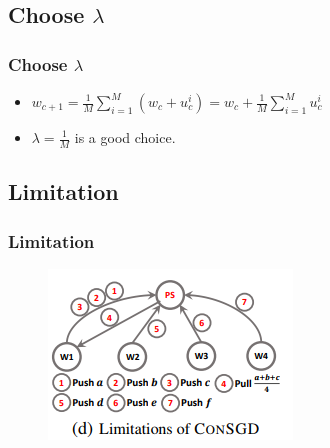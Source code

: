 \subsection{Choose $\lambda$}
\begin{frame}
    \frametitle{Choose $\lambda$}
	\begin{itemize}
		\item $w_{c+1}=\frac{1}{M}\sum_{i=1}^{M}(w_{c}+u_{c}^{i})=w_{c}+\frac{1}{M}\sum_{i=1}^{M}u_{c}^{i}$
		\item $\lambda = \frac{1}{M}$ is a good choice. 
	\end{itemize} 
\end{frame}

\subsection{Limitation}
\begin{frame}
    \frametitle{Limitation}
	\begin{figure}
		\includegraphics[scale=0.8]{figure/consgdlimit.png}
	\end{figure}
\end{frame}


